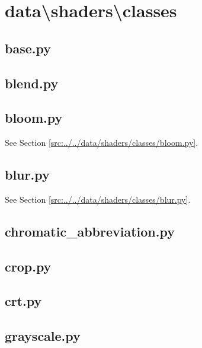 \documentclass[../main/main.tex]{subfiles}
\begin{document}
\section{data\textbackslash shaders\textbackslash classes}
\subsection{base.py}

\label{src:data/shaders/classes/base.py}

\subsection{blend.py}

\label{src:data/shaders/classes/blend.py}

\subsection{bloom.py}
See Section \ref{src:../../data/shaders/classes/bloom.py}.

\subsection{blur.py}
See Section \ref{src:../../data/shaders/classes/blur.py}.

\subsection{chromatic\_abbreviation.py}

\label{src:data/shaders/classes/chromatic_abbreviation.py}

\subsection{crop.py}

\label{src:data/shaders/classes/crop.py}

\subsection{crt.py}

\label{src:data/shaders/classes/crt.py}

\subsection{grayscale.py}

\label{src:data/shaders/classes/grayscale.py}
\end{document}
